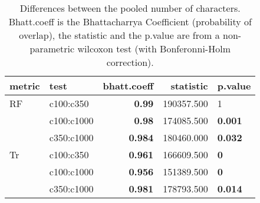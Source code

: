 \begin{table}[ht]
\centering
\begin{tabular}{llr|rl}
  \hline
metric & test & bhatt.coeff & statistic & p.value \\ 
  \hline
RF & c100:c350 & \textbf{0.99} & 190357.500 & 1 \\ 
   & c100:c1000 & \textbf{0.98} & 174085.500 & \textbf{0.001} \\ 
   & c350:c1000 & \textbf{0.984} & 180460.000 & \textbf{0.032} \\ 
  Tr & c100:c350 & \textbf{0.961} & 166609.500 & \textbf{0} \\ 
   & c100:c1000 & \textbf{0.956} & 151389.500 & \textbf{0} \\ 
   & c350:c1000 & \textbf{0.981} & 178793.500 & \textbf{0.014} \\ 
   \hline
\end{tabular}
\caption{Differences between the pooled number of characters. Bhatt.coeff is the Bhattacharrya Coefficient (probability of overlap), the statistic and the p.value are from a non-parametric wilcoxon test (with Bonferonni-Holm correction).} 
\label{Tab_pooledscharacters_test}
\end{table}
